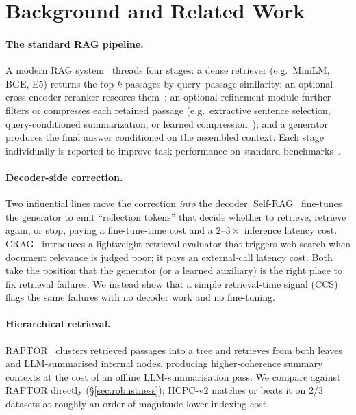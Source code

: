 \section{Background and Related Work}
\label{sec:bg}

\paragraph{The standard RAG pipeline.}
A modern RAG system~\citep{lewis2020rag,gao2024ragsurvey} threads four
stages: a dense retriever (e.g.\ MiniLM, BGE, E5) returns the top-$k$
passages by query--passage similarity; an optional cross-encoder
reranker rescores them~\citep{nogueira2019passage}; an optional
refinement module further filters or compresses each retained passage
(e.g.\ extractive sentence selection, query-conditioned summarization,
or learned compression~\citep{xu2024recomp}); and a generator
produces the final answer conditioned on the assembled context. Each
stage individually is reported to improve task performance on standard
benchmarks~\citep{karpukhin2020dpr,izacard2022few,xiong2024embedder}.

\paragraph{Decoder-side correction.}
Two influential lines move the correction \emph{into} the decoder.
Self-RAG~\citep{asai2024selfrag} fine-tunes the generator to emit
``reflection tokens'' that decide whether to retrieve, retrieve again,
or stop, paying a fine-tune-time cost and a $2\text{--}3\times$
inference latency cost. CRAG~\citep{yan2024crag} introduces a
lightweight retrieval evaluator that triggers web search when document
relevance is judged poor; it pays an external-call latency cost. Both
take the position that the generator (or a learned auxiliary) is the
right place to fix retrieval failures. We instead show that a simple
retrieval-time signal (CCS) flags the same failures with no decoder
work and no fine-tuning.

\paragraph{Hierarchical retrieval.}
RAPTOR~\citep{raptor2024} clusters retrieved passages into a tree and
retrieves from both leaves and LLM-summarised internal nodes,
producing higher-coherence summary contexts at the cost of an offline
LLM-summarisation pass. We compare against RAPTOR directly
(\S\ref{sec:robustness}); HCPC-v$2$ matches or beats it on $2/3$
datasets at roughly an order-of-magnitude lower indexing cost.


